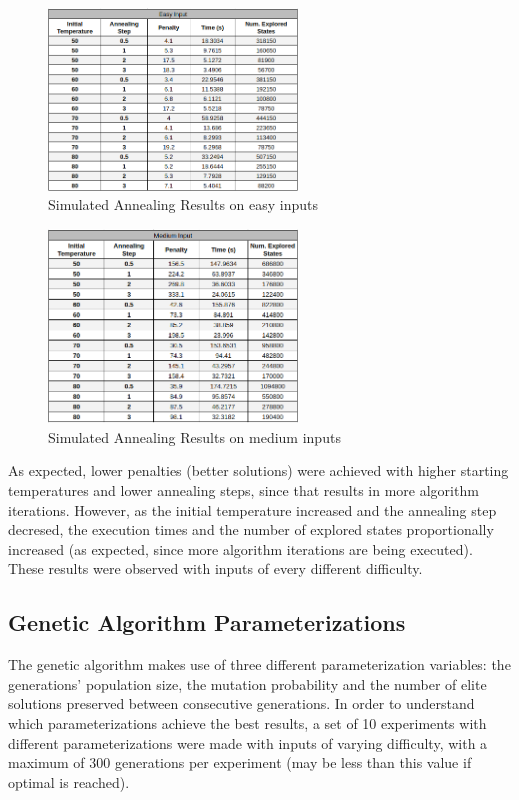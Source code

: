 \documentclass[conference]{IEEEtran}
\begin{document}
\begin{figure}[H]
    \centerline{\includegraphics[width=250px]{annealing_easy.png}}
    \caption{Simulated Annealing Results on easy inputs}
\end{figure}

\begin{figure}[H]
    \centerline{\includegraphics[width=250px]{annealing_medium.png}}
    \caption{Simulated Annealing Results on medium inputs}
\end{figure}

As expected, lower penalties (better solutions) were achieved with higher starting temperatures and lower annealing steps, since that results in more algorithm iterations. However, as the initial temperature increased and the annealing step decresed, the execution times and the number of explored states proportionally increased (as expected, since more algorithm iterations are being executed). These results were observed with inputs of every different difficulty.

\subsection{Genetic Algorithm Parameterizations}

The genetic algorithm makes use of three different parameterization variables: the generations' population size, the mutation probability and the number of elite solutions preserved between consecutive generations. In order to understand which parameterizations achieve the best results, a set of 10 experiments with different parameterizations were made with inputs of varying difficulty, with a maximum of 300 generations per experiment (may be less than this value if optimal is reached).
\end{document}
